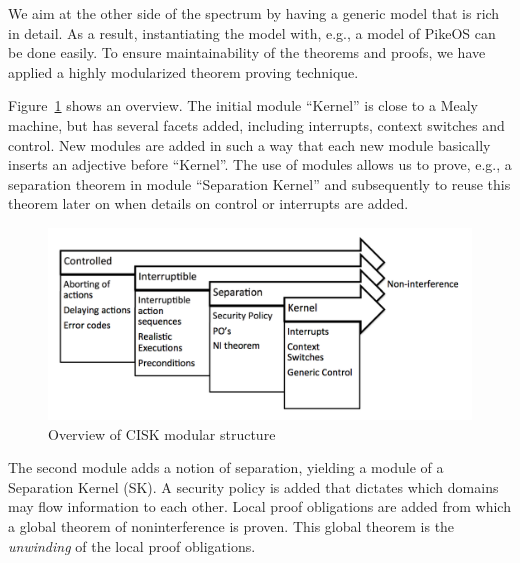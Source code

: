 \documentclass[11pt,a4paper]{article}
\begin{document}
We aim at the other side of the spectrum by having a generic model that is rich in detail.
As a result, instantiating the model with, e.g., a model of PikeOS can be done easily.
To ensure maintainability of the theorems and proofs, we have applied a highly 
modularized theorem proving technique.


Figure~\ref{fig:extensions} shows an overview.
The initial module ``Kernel'' is close to a Mealy machine, but has several 
facets added, including interrupts, context switches and control.
New modules are added in such a way that each new module basically inserts an 
adjective before ``Kernel''.
The use of modules allows us to prove, e.g., a separation theorem in module 
``Separation Kernel'' and subsequently to reuse this theorem later on when details 
on control or interrupts are added.
\begin{figure}[htb]
\centering
\includegraphics[width=\linewidth]{locales.png}
\caption{Overview of CISK modular structure}
\label{fig:extensions}
\end{figure}


The second module adds a notion of separation, yielding a module of a Separation 
Kernel (SK). A security policy is added that dictates which domains may flow 
information to each other. Local proof obligations are added from which a global 
theorem of noninterference is proven. This global theorem is the \emph{unwinding} 
of the local proof obligations.
\end{document}
